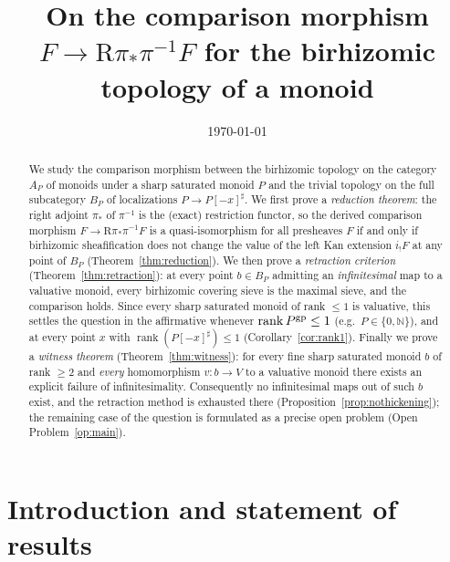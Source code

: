 \documentclass[11pt]{amsart}
\theoremstyle{plain}
\theoremstyle{remark}
\theoremstyle{definition}
\numberwithin{equation}{section}
\begin{document}
\title[The birhizomic comparison morphism]{On the comparison morphism
$F \to \mathrm R\pi_*\pi^{-1}F$ for the birhizomic topology of a monoid}

\author{}
\date{\today}

\begin{abstract}
We study the comparison morphism between the birhizomic topology on the
category $A_P$ of monoids under a sharp saturated monoid $P$ and the
trivial topology on the full subcategory $B_P$ of localizations
$P\to P[-x]^\sharp$.  We first prove a \emph{reduction theorem}: the right
adjoint $\pi_*$ of $\pi^{-1}$ is the (exact) restriction functor, so the
derived comparison morphism $F\to\mathrm R\pi_*\pi^{-1}F$ is a
quasi-isomorphism for all presheaves $F$ if and only if birhizomic
sheafification does not change the value of the left Kan extension
$i_!F$ at any point of $B_P$ (Theorem~\ref{thm:reduction}).  We then prove
a \emph{retraction criterion} (Theorem~\ref{thm:retraction}): at every
point $b\in B_P$ admitting an \emph{infinitesimal} map to a valuative
monoid, every birhizomic covering sieve is the maximal sieve, and the
comparison holds.  Since every sharp saturated monoid of rank $\le 1$ is
valuative, this settles the question in the affirmative whenever
$\operatorname{rank}P^{\rm gp}\le 1$ (e.g.\ $P\in\{0,\mathbb N\}$), and at
every point $x$ with $\operatorname{rank}(P[-x]^\sharp)\le 1$
(Corollary~\ref{cor:rank1}).  Finally we prove a \emph{witness theorem}
(Theorem~\ref{thm:witness}): for every fine sharp saturated monoid $b$ of
rank $\ge 2$ and \emph{every} homomorphism $v\colon b\to V$ to a valuative
monoid there exists an explicit failure of infinitesimality.  Consequently
no infinitesimal maps out of such $b$ exist, and the retraction method is
exhausted there (Proposition~\ref{prop:nothickening}); the remaining case
of the question is formulated as a precise open problem
(Open Problem~\ref{op:main}).
\end{abstract}

\maketitle

\section{Introduction and statement of results}
\end{document}
